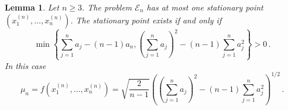 \documentclass[10pt,a4paper]{amsart}
\newtheorem{lem}{Lemma}
\begin{document}
\begin{lem} \label{l5.8}
   Let $n \geq 3$. The problem ${\mathcal E}_n$ has at most one stationary point $(x_1^{(n)},\ldots,x_n^{(n)} )$. The stationary point exists if and only if 
   \begin{equation}   \label{f5.17}
       \min \left\{ \sum_{j=1}^n a_j - (n-1) a_n , \left(\sum_{j=1}^n a_j \right)^2  - (n-1)\sum_{j=1}^n a_j^2 \right\} > 0 \, .
   \end{equation}
In this case
   \begin{equation}   \label{f5.18}
        \mu_n= f(x_1^{(n)},\ldots,x_n^{(n)}) = \sqrt{\frac{2}{n-1}} \left( \left(\sum_{j=1}^n a_j \right)^2 - (n-1) \sum_{j=1}^n a_j^2 \right)^{1/2} \, .
   \end{equation}     
\end{lem}
\end{document}
